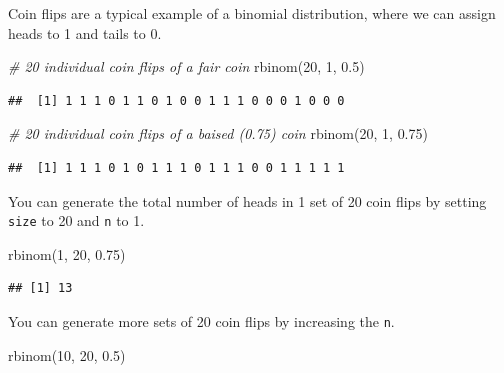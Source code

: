 \documentclass[
  oneside]{book}
\newenvironment{Shaded}{\begin{snugshade}}{\end{snugshade}}
\newcommand{\CommentTok}[1]{\textcolor[rgb]{0.56,0.35,0.01}{\textit{#1}}}
\newcommand{\DecValTok}[1]{\textcolor[rgb]{0.00,0.00,0.81}{#1}}
\newcommand{\FloatTok}[1]{\textcolor[rgb]{0.00,0.00,0.81}{#1}}
\newcommand{\FunctionTok}[1]{\textcolor[rgb]{0.00,0.00,0.00}{#1}}
\newcommand{\NormalTok}[1]{#1}
\begin{document}
Coin flips are a typical example of a binomial distribution, where we can assign heads to 1 and tails to 0.

\begin{Shaded}
\begin{Highlighting}[]
\CommentTok{\# 20 individual coin flips of a fair coin}
\FunctionTok{rbinom}\NormalTok{(}\DecValTok{20}\NormalTok{, }\DecValTok{1}\NormalTok{, }\FloatTok{0.5}\NormalTok{)}
\end{Highlighting}
\end{Shaded}

\begin{verbatim}
##  [1] 1 1 1 0 1 1 0 1 0 0 1 1 1 0 0 0 1 0 0 0
\end{verbatim}

\begin{Shaded}
\begin{Highlighting}[]
\CommentTok{\# 20 individual coin flips of a baised (0.75) coin}
\FunctionTok{rbinom}\NormalTok{(}\DecValTok{20}\NormalTok{, }\DecValTok{1}\NormalTok{, }\FloatTok{0.75}\NormalTok{)}
\end{Highlighting}
\end{Shaded}

\begin{verbatim}
##  [1] 1 1 1 0 1 0 1 1 1 0 1 1 1 0 0 1 1 1 1 1
\end{verbatim}

You can generate the total number of heads in 1 set of 20 coin flips by setting \texttt{size} to 20 and \texttt{n} to 1.

\begin{Shaded}
\begin{Highlighting}[]
\FunctionTok{rbinom}\NormalTok{(}\DecValTok{1}\NormalTok{, }\DecValTok{20}\NormalTok{, }\FloatTok{0.75}\NormalTok{)}
\end{Highlighting}
\end{Shaded}

\begin{verbatim}
## [1] 13
\end{verbatim}

You can generate more sets of 20 coin flips by increasing the \texttt{n}.

\begin{Shaded}
\begin{Highlighting}[]
\FunctionTok{rbinom}\NormalTok{(}\DecValTok{10}\NormalTok{, }\DecValTok{20}\NormalTok{, }\FloatTok{0.5}\NormalTok{)}
\end{Highlighting}
\end{Shaded}
\end{document}
